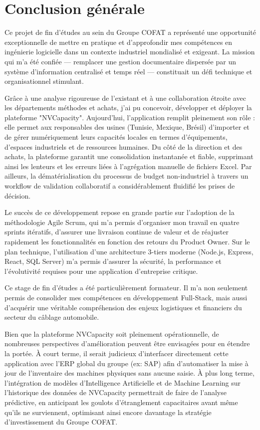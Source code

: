 \chapter*{Conclusion générale}

Ce projet de fin d'études au sein du Groupe COFAT a représenté une opportunité exceptionnelle de mettre en pratique et d'approfondir mes compétences en ingénierie logicielle dans un contexte industriel mondialisé et exigeant. La mission qui m'a été confiée — remplacer une gestion documentaire dispersée par un système d'information centralisé et temps réel — constituait un défi technique et organisationnel stimulant.

Grâce à une analyse rigoureuse de l'existant et à une collaboration étroite avec les départements méthodes et achats, j'ai pu concevoir, développer et déployer la plateforme "NVCapacity". Aujourd'hui, l'application remplit pleinement son rôle : elle permet aux responsables des usines (Tunisie, Mexique, Brésil) d'importer et de gérer numériquement leurs capacités locales en termes d'équipements, d'espaces industriels et de ressources humaines. Du côté de la direction et des achats, la plateforme garantit une consolidation instantanée et fiable, supprimant ainsi les lenteurs et les erreurs liées à l'agrégation manuelle de fichiers Excel. Par ailleurs, la dématérialisation du processus de budget non-industriel à travers un workflow de validation collaboratif a considérablement fluidifié les prises de décision.

Le succès de ce développement repose en grande partie sur l'adoption de la méthodologie Agile Scrum, qui m'a permis d'organiser mon travail en quatre sprints itératifs, d'assurer une livraison continue de valeur et de réajuster rapidement les fonctionnalités en fonction des retours du Product Owner. Sur le plan technique, l'utilisation d'une architecture 3-tiers moderne (Node.js, Express, React, SQL Server) m'a permis d'assurer la sécurité, la performance et l'évolutivité requises pour une application d'entreprise critique.

Ce stage de fin d'études a été particulièrement formateur. Il m'a non seulement permis de consolider mes compétences en développement Full-Stack, mais aussi d'acquérir une véritable compréhension des enjeux logistiques et financiers du secteur du câblage automobile.

Bien que la plateforme NVCapacity soit pleinement opérationnelle, de nombreuses perspectives d'amélioration peuvent être envisagées pour en étendre la portée. À court terme, il serait judicieux d'interfacer directement cette application avec l'ERP global du groupe (ex: SAP) afin d'automatiser la mise à jour de l'inventaire des machines physiques sans aucune saisie. À plus long terme, l'intégration de modèles d'Intelligence Artificielle et de Machine Learning sur l'historique des données de NVCapacity permettrait de faire de l'analyse prédictive, en anticipant les goulots d'étranglement capacitaires avant même qu'ils ne surviennent, optimisant ainsi encore davantage la stratégie d'investissement du Groupe COFAT.

